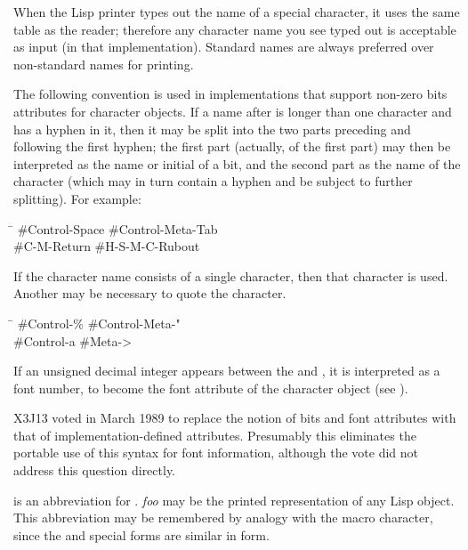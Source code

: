 \begin{flushdesc}
When the Lisp printer types out the name of a special character, it uses the
same table as the \cd{\#{\Xbackslash}} reader; therefore any character name you see typed out
is acceptable as input (in that implementation).  Standard names are always
preferred over non-standard names for printing.

The following convention is used in implementations that support
non-zero bits attributes for character objects.
If a name after \cd{\#{\Xbackslash}} is longer than one character and has a hyphen in it,
then it may be split into the two parts preceding
and following the first hyphen; the first part (actually, 
of the first part)
may then be interpreted as
the name or initial of a bit, and the second part as the name of the character
(which may in turn contain a hyphen and be subject to further splitting).
For example:
\begin{lisp}
\hskip10pc\=\kill
\#{\Xbackslash}Control-Space			\>\#{\Xbackslash}Control-Meta-Tab \\
\#{\Xbackslash}C-M-Return			\>\#{\Xbackslash}H-S-M-C-Rubout
\end{lisp}
If the character name consists of a single character, then that character
is used.  Another \cd{{\Xbackslash}} may be necessary to quote the character.
\begin{lisp}
\hskip10pc\=\kill
\#{\Xbackslash}Control-\%			\>\#{\Xbackslash}Control-Meta-{\Xbackslash}" \\
\#{\Xbackslash}Control-{\Xbackslash}a			\>\#{\Xbackslash}Meta->
\end{lisp}

\begin{obsolete}
If an unsigned decimal integer appears between the \cd{\#} and \cd{{\Xbackslash}},
it is interpreted as a font number, to become the font attribute
of the character object (see ).
\end{obsolete}

\begin{newer}
X3J13 voted in March 1989 
to replace the notion of bits and font attributes with
that of implementation-defined attributes.  Presumably
this eliminates the portable use of this syntax for font information,
although the vote did not address this question directly.
\end{newer}

\item[\cd{\#'}]
 is an abbreviation for .
{\it foo} may be the printed representation of any Lisp object.
This abbreviation may be remembered by analogy with the 
macro character, since the  and  special forms are
similar in form.


\end{flushdesc}
